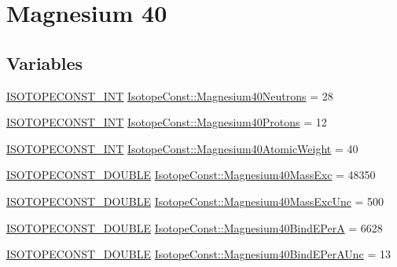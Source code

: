 \hypertarget{group___isotope_const-_magnesium-_mg40}{}\section{Magnesium 40}
\label{group___isotope_const-_magnesium-_mg40}
\subsection*{Variables}
\begin{DoxyCompactItemize}
\item 
\mbox{\hyperlink{group___isotope_const-_macros_ga5f18360b3e99483a35c32d789e62621c}{I\+S\+O\+T\+O\+P\+E\+C\+O\+N\+S\+T\+\_\+\+I\+NT}} \mbox{\hyperlink{group___isotope_const-_magnesium-_mg40_gadba7b734bf314bb972fe24351e12aa58}{Isotope\+Const\+::\+Magnesium40\+Neutrons}} = 28
\item 
\mbox{\hyperlink{group___isotope_const-_macros_ga5f18360b3e99483a35c32d789e62621c}{I\+S\+O\+T\+O\+P\+E\+C\+O\+N\+S\+T\+\_\+\+I\+NT}} \mbox{\hyperlink{group___isotope_const-_magnesium-_mg40_ga9247fa3c9c0808ddf49b91603bd6684b}{Isotope\+Const\+::\+Magnesium40\+Protons}} = 12
\item 
\mbox{\hyperlink{group___isotope_const-_macros_ga5f18360b3e99483a35c32d789e62621c}{I\+S\+O\+T\+O\+P\+E\+C\+O\+N\+S\+T\+\_\+\+I\+NT}} \mbox{\hyperlink{group___isotope_const-_magnesium-_mg40_ga7ddf19424ac4cf8d4146e661da56b67c}{Isotope\+Const\+::\+Magnesium40\+Atomic\+Weight}} = 40
\item 
\mbox{\hyperlink{group___isotope_const-_macros_ga8f45a7272ce02c0b4c65c44636ed719a}{I\+S\+O\+T\+O\+P\+E\+C\+O\+N\+S\+T\+\_\+\+D\+O\+U\+B\+LE}} \mbox{\hyperlink{group___isotope_const-_magnesium-_mg40_ga5697cf6797932935c997560459ec53f6}{Isotope\+Const\+::\+Magnesium40\+Mass\+Exc}} = 48350
\item 
\mbox{\hyperlink{group___isotope_const-_macros_ga8f45a7272ce02c0b4c65c44636ed719a}{I\+S\+O\+T\+O\+P\+E\+C\+O\+N\+S\+T\+\_\+\+D\+O\+U\+B\+LE}} \mbox{\hyperlink{group___isotope_const-_magnesium-_mg40_ga11b7d3c3dce48afd0292c109b0918176}{Isotope\+Const\+::\+Magnesium40\+Mass\+Exc\+Unc}} = 500
\item 
\mbox{\hyperlink{group___isotope_const-_macros_ga8f45a7272ce02c0b4c65c44636ed719a}{I\+S\+O\+T\+O\+P\+E\+C\+O\+N\+S\+T\+\_\+\+D\+O\+U\+B\+LE}} \mbox{\hyperlink{group___isotope_const-_magnesium-_mg40_gab4d14be5f53008c6e03cd263d206597e}{Isotope\+Const\+::\+Magnesium40\+Bind\+E\+PerA}} = 6628
\item 
\mbox{\hyperlink{group___isotope_const-_macros_ga8f45a7272ce02c0b4c65c44636ed719a}{I\+S\+O\+T\+O\+P\+E\+C\+O\+N\+S\+T\+\_\+\+D\+O\+U\+B\+LE}} \mbox{\hyperlink{group___isotope_const-_magnesium-_mg40_gaa83d395215afed9b8d2cfedea14bf5bf}{Isotope\+Const\+::\+Magnesium40\+Bind\+E\+Per\+A\+Unc}} = 13

\end{DoxyCompactItemize}
